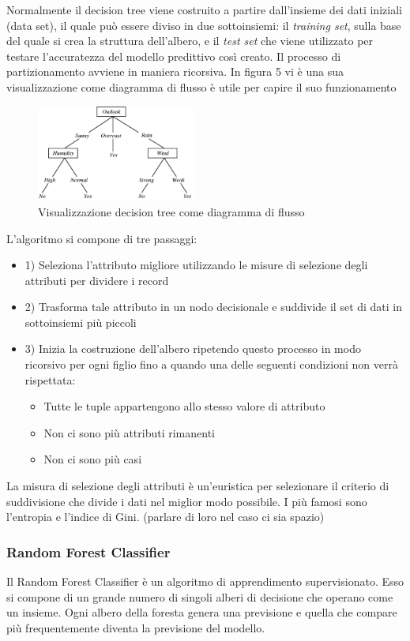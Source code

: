 \documentclass[12pt,italian]{report}
\begin{document}
Normalmente il decision tree viene costruito a partire dall'insieme dei dati iniziali (data set), il quale può essere diviso in due sottoinsiemi: il \textit{training set}, sulla base del quale si crea la struttura dell'albero, e il \textit{test set} che viene utilizzato per testare l'accuratezza del modello predittivo così creato.
Il processo di partizionamento avviene in maniera ricorsiva. In figura 5 vi è una sua visualizzazione come diagramma di flusso è utile per capire il suo funzionamento
\begin{figure}[h]
	\centering
	\includegraphics[width = 52mm]{immagini/decision_tree}
	\caption{Visualizzazione decision tree come diagramma di flusso}
\end{figure}

L'algoritmo si compone di tre passaggi:
\begin{itemize}
	\item 1) Seleziona l'attributo migliore utilizzando le misure di selezione degli attributi per dividere i record
	\item 2) Trasforma tale attributo in un nodo decisionale e suddivide il set di dati in sottoinsiemi più piccoli
	\item 3) Inizia la costruzione dell'albero ripetendo questo processo in modo ricorsivo per ogni figlio fino a quando una delle seguenti condizioni non verrà rispettata:
	\begin{itemize}
		\item Tutte le tuple appartengono allo stesso valore di attributo
		\item Non ci sono più attributi rimanenti
		\item Non ci sono più casi
	\end{itemize}
\end{itemize}

La misura di selezione degli attributi è un'euristica per selezionare il criterio di suddivisione che divide i dati nel miglior modo possibile. I più famosi sono l'entropia e l'indice di Gini.
(parlare di loro nel caso ci sia spazio)

\subsubsection{Random Forest Classifier}
Il Random Forest Classifier è un algoritmo di apprendimento supervisionato. Esso si compone di un grande numero di singoli alberi di decisione che operano come un insieme. Ogni albero della foresta genera una previsione e quella che compare più frequentemente diventa la previsione del modello. 
\end{document}
